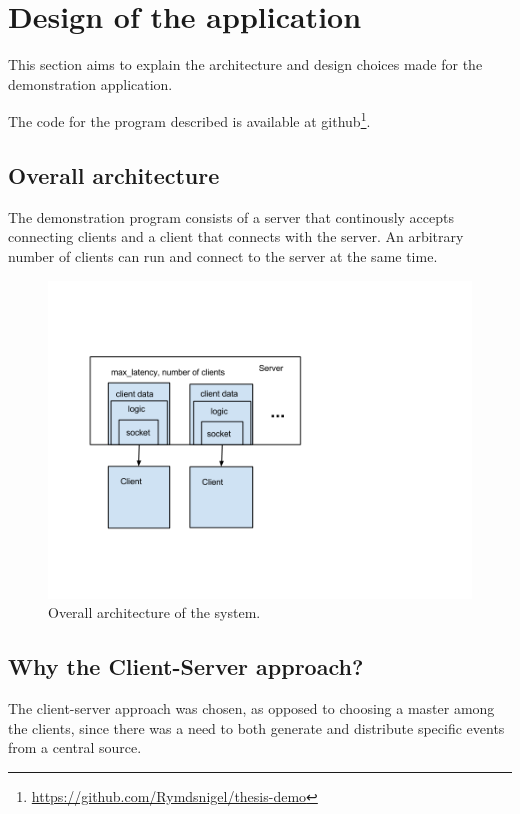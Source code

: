 \chapter{Design of the application}

This section aims to explain the architecture and design choices made for the demonstration application.

The code for the program described is available at github\footnote{ \url{https://github.com/Rymdsnigel/thesis-demo}}.

\section{Overall architecture}
The demonstration program consists of a server that continously accepts connecting clients and a client that connects with the server. An arbitrary number of clients can run and connect to the server at the same time. 

\begin{figure}[h!]
\centering
\includegraphics[width=1.0\textwidth]{figures/arch.png}
\caption{Overall architecture of the system.}
\end{figure}


\section{Why the Client-Server approach?}
The client-server approach was chosen, as opposed to choosing a master among the clients, since there was a need to both generate and distribute specific events from a central source.

